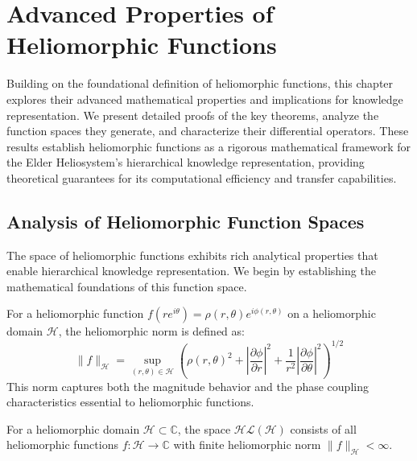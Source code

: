 \chapter{Advanced Properties of Heliomorphic Functions}

\begin{tcolorbox}[colback=DarkSkyBlue!5!white,colframe=DarkSkyBlue!75!black,title=Chapter Summary]
Building on the foundational definition of heliomorphic functions, this chapter explores their advanced mathematical properties and implications for knowledge representation. We present detailed proofs of the key theorems, analyze the function spaces they generate, and characterize their differential operators. These results establish heliomorphic functions as a rigorous mathematical framework for the Elder Heliosystem's hierarchical knowledge representation, providing theoretical guarantees for its computational efficiency and transfer capabilities.
\end{tcolorbox}

\section{Analysis of Heliomorphic Function Spaces}

The space of heliomorphic functions exhibits rich analytical properties that enable hierarchical knowledge representation. We begin by establishing the mathematical foundations of this function space.

\begin{definition}
For a heliomorphic function $f(re^{i\theta}) = \rho(r,\theta)e^{i\phi(r,\theta)}$ on a heliomorphic domain $\mathcal{H}$, the heliomorphic norm is defined as:
\begin{equation}
\|f\|_{\mathcal{H}} = \sup_{(r,\theta) \in \mathcal{H}} \left( \rho(r,\theta)^2 + \left|\frac{\partial \phi}{\partial r}\right|^2 + \frac{1}{r^2}\left|\frac{\partial \phi}{\partial \theta}\right|^2 \right)^{1/2}
\end{equation}
This norm captures both the magnitude behavior and the phase coupling characteristics essential to heliomorphic functions.
\end{definition}

\begin{definition}
For a heliomorphic domain $\mathcal{H} \subset \mathbb{C}$, the space $\mathcal{HL}(\mathcal{H})$ consists of all heliomorphic functions $f: \mathcal{H} \rightarrow \mathbb{C}$ with finite heliomorphic norm $\|f\|_{\mathcal{H}} < \infty$.
\end{definition}

